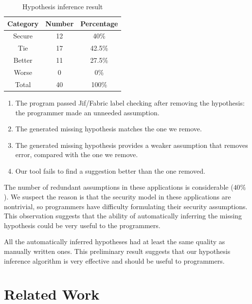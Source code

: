 \begin{table}
\centering
\begin{tabular}{|c | c | c|}
\hline
Category & Number & Percentage \\
\hline
Secure & 12 & 40\% \\
\hline
Tie & 17 & 42.5\% \\
\hline
Better & 11 & 27.5\% \\
\hline
Worse & 0 & 0\% \\
\hline
Total & 40 & 100\% \\
\hline
\end{tabular}
\label{table:hyporesult}
\caption{Hypothesis inference result}
\end{table}

\begin{enumerate}
\item The program passed Jif/Fabric label checking after removing the
hypothesis: the programmer made an unneeded assumption.

\item The generated missing hypothesis matches the one we remove.

\item The generated missing hypothesis provides a weaker assumption
that removes error, compared with the one we remove.

\item Our tool fails to find a suggestion better than the one
removed.
\end{enumerate}

The number of redundant assumptions in these
applications is considerable ($40\%$). We suspect the reason is that
the security model in these applications are nontrivial, so
programmers have difficulty formulating their security assumptions.
This observation suggests that the ability of automatically inferring
the missing hypothesis could be very useful to the programmers.

All the automatically inferred hypotheses had at least the same quality as
manually written ones.
This preliminary result suggests that our hypothesis inference
algorithm is very effective and should be useful to programmers.
 
\section{Related Work}

